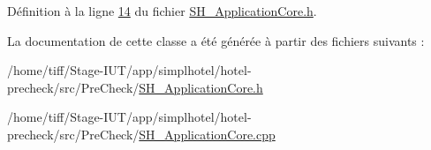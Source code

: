 Définition à la ligne \hyperlink{SH__ApplicationCore_8h_source_l00014}{14} du fichier \hyperlink{SH__ApplicationCore_8h_source}{S\-H\-\_\-\-Application\-Core.\-h}.



La documentation de cette classe a été générée à partir des fichiers suivants \-:\begin{DoxyCompactItemize}
\item 
/home/tiff/\-Stage-\/\-I\-U\-T/app/simplhotel/hotel-\/precheck/src/\-Pre\-Check/\hyperlink{SH__ApplicationCore_8h}{S\-H\-\_\-\-Application\-Core.\-h}\item 
/home/tiff/\-Stage-\/\-I\-U\-T/app/simplhotel/hotel-\/precheck/src/\-Pre\-Check/\hyperlink{SH__ApplicationCore_8cpp}{S\-H\-\_\-\-Application\-Core.\-cpp}\end{DoxyCompactItemize}
